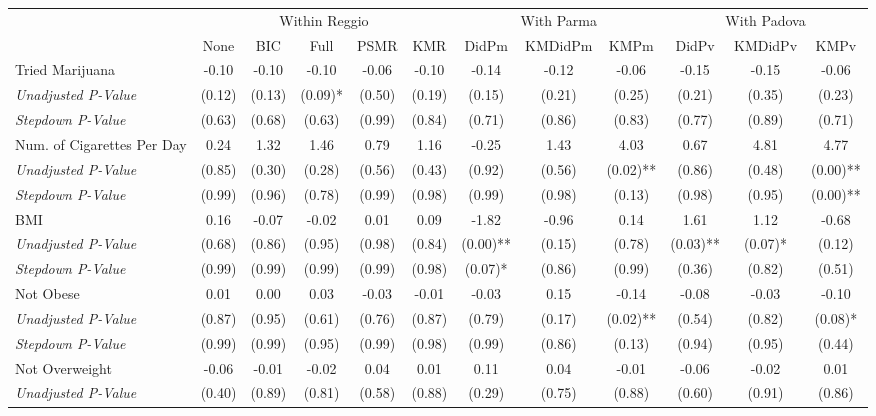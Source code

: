 \begin{tabular}{l c c c c c c c c c c c}
\toprule
& \multicolumn{5}{c}{Within Reggio} & \multicolumn{3}{c}{With Parma} & \multicolumn{3}{c}{With Padova} \\\cmidrule(lr){2-6} \cmidrule(lr){7-9} \cmidrule(lr){10-12}
 & None & BIC & Full & PSMR & KMR & DidPm & KMDidPm & KMPm & DidPv & KMDidPv & KMPv \\
\midrule
Tried Marijuana & -0.10 & -0.10 & -0.10 & -0.06 & -0.10 & -0.14 & -0.12 & -0.06 & -0.15 & -0.15 & -0.06 \\
\quad \textit{Unadjusted P-Value} & (0.12) & (0.13) & (0.09)* & (0.50) & (0.19) & (0.15) & (0.21) & (0.25) & (0.21) & (0.35) & (0.23) \\
\quad \textit{Stepdown P-Value} & (0.63) & (0.68) & (0.63) & (0.99) & (0.84) & (0.71) & (0.86) & (0.83) & (0.77) & (0.89) & (0.71) \\
Num. of Cigarettes Per Day & 0.24 & 1.32 & 1.46 & 0.79 & 1.16 & -0.25 & 1.43 & 4.03 & 0.67 & 4.81 & 4.77 \\
\quad \textit{Unadjusted P-Value} & (0.85) & (0.30) & (0.28) & (0.56) & (0.43) & (0.92) & (0.56) & (0.02)** & (0.86) & (0.48) & (0.00)** \\
\quad \textit{Stepdown P-Value} & (0.99) & (0.96) & (0.78) & (0.99) & (0.98) & (0.99) & (0.98) & (0.13) & (0.98) & (0.95) & (0.00)** \\
BMI & 0.16 & -0.07 & -0.02 & 0.01 & 0.09 & -1.82 & -0.96 & 0.14 & 1.61 & 1.12 & -0.68 \\
\quad \textit{Unadjusted P-Value} & (0.68) & (0.86) & (0.95) & (0.98) & (0.84) & (0.00)** & (0.15) & (0.78) & (0.03)** & (0.07)* & (0.12) \\
\quad \textit{Stepdown P-Value} & (0.99) & (0.99) & (0.99) & (0.99) & (0.98) & (0.07)* & (0.86) & (0.99) & (0.36) & (0.82) & (0.51) \\
Not Obese & 0.01 & 0.00 & 0.03 & -0.03 & -0.01 & -0.03 & 0.15 & -0.14 & -0.08 & -0.03 & -0.10 \\
\quad \textit{Unadjusted P-Value} & (0.87) & (0.95) & (0.61) & (0.76) & (0.87) & (0.79) & (0.17) & (0.02)** & (0.54) & (0.82) & (0.08)* \\
\quad \textit{Stepdown P-Value} & (0.99) & (0.99) & (0.95) & (0.99) & (0.98) & (0.99) & (0.86) & (0.13) & (0.94) & (0.95) & (0.44) \\
Not Overweight & -0.06 & -0.01 & -0.02 & 0.04 & 0.01 & 0.11 & 0.04 & -0.01 & -0.06 & -0.02 & 0.01 \\
\quad \textit{Unadjusted P-Value} & (0.40) & (0.89) & (0.81) & (0.58) & (0.88) & (0.29) & (0.75) & (0.88) & (0.60) & (0.91) & (0.86) \\

\end{tabular}
